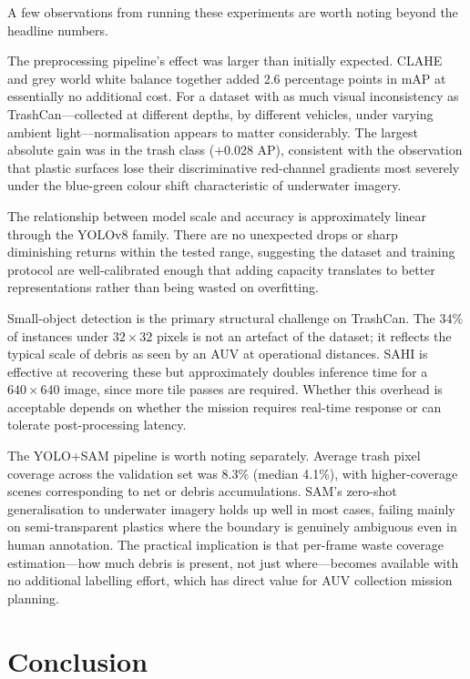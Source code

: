 \documentclass[conference]{IEEEtran}
\begin{document}
A few observations from running these experiments are worth noting beyond
the headline numbers.

The preprocessing pipeline's effect was larger than initially expected.
CLAHE and grey world white balance together added 2.6 percentage points in
mAP at essentially no additional cost. For a dataset with as much visual
inconsistency as TrashCan---collected at different depths, by different
vehicles, under varying ambient light---normalisation appears to matter
considerably. The largest absolute gain was in the trash class
($+$0.028 AP), consistent with the observation that plastic surfaces lose
their discriminative red-channel gradients most severely under the
blue-green colour shift characteristic of underwater imagery.

The relationship between model scale and accuracy is approximately linear
through the YOLOv8 family. There are no unexpected drops or sharp
diminishing returns within the tested range, suggesting the dataset and
training protocol are well-calibrated enough that adding capacity
translates to better representations rather than being wasted on
overfitting.

Small-object detection is the primary structural challenge on TrashCan.
The 34\% of instances under $32 \times 32$ pixels is not an artefact of
the dataset; it reflects the typical scale of debris as seen by an AUV at
operational distances. SAHI is effective at recovering these but
approximately doubles inference time for a $640 \times 640$ image, since
more tile passes are required. Whether this overhead is acceptable depends
on whether the mission requires real-time response or can tolerate
post-processing latency.

The YOLO+SAM pipeline is worth noting separately. Average trash pixel
coverage across the validation set was 8.3\% (median 4.1\%), with
higher-coverage scenes corresponding to net or debris accumulations.
SAM's zero-shot generalisation to underwater imagery holds up well in
most cases, failing mainly on semi-transparent plastics where the boundary
is genuinely ambiguous even in human annotation. The practical implication
is that per-frame waste coverage estimation---how much debris is present,
not just where---becomes available with no additional labelling effort,
which has direct value for AUV collection mission planning.


\section{Conclusion}
\end{document}
